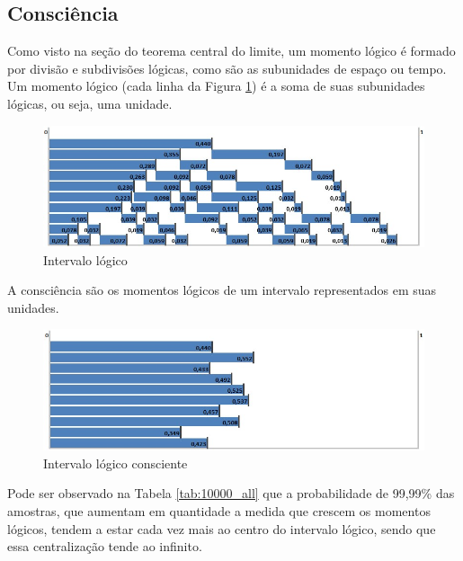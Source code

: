 \subsection{Consciência}
Como visto na seção do teorema central do limite, um momento lógico é formado por divisão e subdivisões lógicas, como são as subunidades de espaço ou tempo. Um momento lógico (cada linha da Figura \ref{fig:consciousness_logical_moments}) é a soma de suas subunidades lógicas, ou seja, uma unidade.

\begin{figure}[H]
\caption{Intervalo lógico}
\label{fig:consciousness_logical_moments}
\centering
\includegraphics[scale=.7]{sections/images/consciousness_logical_moments.jpg}
\end{figure}

A consciência são os momentos lógicos de um intervalo representados em suas unidades.

\begin{figure}[H]
\caption{Intervalo lógico consciente}
\label{fig:consciousness}
\centering
\includegraphics[scale=.7]{sections/images/consciousness.jpg}
\end{figure}

Pode ser observado na Tabela \ref{tab:10000_all} que a probabilidade de 99,99\% das amostras, que aumentam em quantidade a medida que crescem os momentos lógicos, tendem a estar cada vez mais ao centro do intervalo lógico, sendo que essa centralização tende ao infinito.

